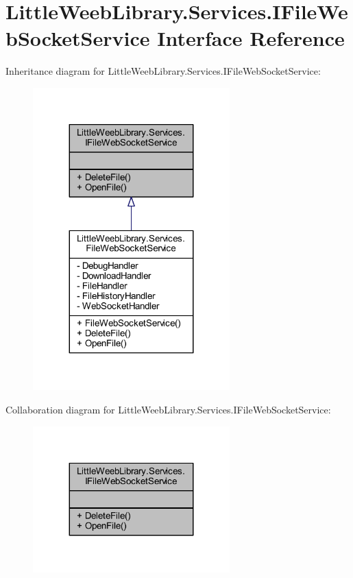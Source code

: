 \hypertarget{interface_little_weeb_library_1_1_services_1_1_i_file_web_socket_service}{}\section{Little\+Weeb\+Library.\+Services.\+I\+File\+Web\+Socket\+Service Interface Reference}
\label{interface_little_weeb_library_1_1_services_1_1_i_file_web_socket_service}


Inheritance diagram for Little\+Weeb\+Library.\+Services.\+I\+File\+Web\+Socket\+Service\+:\nopagebreak
\begin{figure}[H]
\begin{center}
\leavevmode
\includegraphics[width=215pt]{interface_little_weeb_library_1_1_services_1_1_i_file_web_socket_service__inherit__graph}
\end{center}
\end{figure}


Collaboration diagram for Little\+Weeb\+Library.\+Services.\+I\+File\+Web\+Socket\+Service\+:\nopagebreak
\begin{figure}[H]
\begin{center}
\leavevmode
\includegraphics[width=215pt]{interface_little_weeb_library_1_1_services_1_1_i_file_web_socket_service__coll__graph}
\end{center}
\end{figure}
